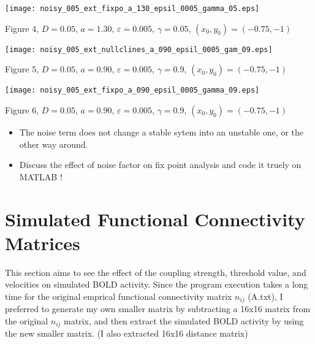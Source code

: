 \documentclass{article}
\begin{document}
\begin{center}
\texttt{[image: noisy\_005\_ext\_fixpo\_a\_130\_epsil\_0005\_gamma\_05.eps]}
\begin{footnotesize}
 Figure 4,  $D=0.05$, $a=1.30$, $\varepsilon=0.005$,          $\gamma=0.05$, $(x_0,y_0)=(-0.75,-1)$  
\end{footnotesize}
\end{center}

\begin{center}
\texttt{[image: noisy\_005\_ext\_nullclines\_a\_090\_epsil\_0005\_gam\_09.eps]}
\begin{footnotesize}
 Figure 5,  $D=0.05$, $a=0.90$, $\varepsilon=0.005$,          $\gamma=0.9$, $(x_0,y_0)=(-0.75,-1)$  
\end{footnotesize}
\end{center}

\begin{center}
\texttt{[image: noisy\_005\_ext\_fixpo\_a\_090\_epsil\_0005\_gamma\_09.eps]}
\begin{footnotesize}
 Figure 6,  $D=0.05$, $a=0.90$, $\varepsilon=0.005$,          $\gamma=0.9$, $(x_0,y_0)=(-0.75,-1)$  
\end{footnotesize}
\end{center}

\begin{itemize}
 \item The noise term does not change a stable sytem into an unstable one, or the other way around.

\item Discuss the effect of noise factor on fix point analysis and code it truely on MATLAB ! 
\end{itemize}

\section{Simulated Functional Connectivity Matrices}

This section aims to see the effect of the coupling strength, threshold value, and velocities on simulated BOLD activity. Since the program execution takes a long time for the original emprical functional connectivity matrix $n_{ij}$ (A.txt), I preferred to generate my own smaller matrix by subtracting a 16x16 matrix from the original $n_{ij}$ matrix, and then extract the simulated BOLD activity by using the new smaller matrix. (I also extracted 16x16 distance matrix)
\end{document}
